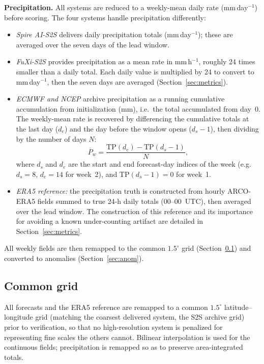 \documentclass[11pt,a4paper]{article}
\begin{document}
\textbf{Precipitation.}
All systems are reduced to a weekly-mean daily rate (mm\,day$^{-1}$)
before scoring. The four systems handle precipitation differently:
\begin{itemize}
  \item \textit{Spire AI-S2S} delivers daily precipitation totals
    (mm\,day$^{-1}$); these are averaged over the seven days of the
    lead window.
  \item \textit{FuXi-S2S} provides precipitation as a mean rate in
    mm\,h$^{-1}$, roughly 24 times smaller than a daily total.
    Each daily value is multiplied by 24 to convert to
    mm\,day$^{-1}$, then the seven days are averaged
    (Section~\ref{sec:metrics}).
  \item \textit{ECMWF and NCEP} archive precipitation as a running
    cumulative accumulation from initialization (mm), i.e.\ the total
    accumulated from day~0. The weekly-mean rate is recovered by
    differencing the cumulative totals at the last day ($d_e$) and the
    day before the window opens ($d_s - 1$), then dividing by the
    number of days $N$:
    \begin{equation}
      \overline{P}_{w} = \frac{\mathrm{TP}(d_e) - \mathrm{TP}(d_s-1)}{N},
      \label{eq:deaccum}
    \end{equation}
    where $d_s$ and $d_e$ are the start and end forecast-day indices
    of the week (e.g.\ $d_s=8$, $d_e=14$ for week~2), and
    $\mathrm{TP}(d_s-1)=0$ for week~1.
  \item \textit{ERA5 reference:} the precipitation truth is constructed
    from hourly ARCO-ERA5 fields summed to true 24-h daily totals
    (00--00~UTC), then averaged over the lead window. The construction
    of this reference and its importance for avoiding a known
    under-counting artifact are detailed in Section~\ref{sec:metrics}.
\end{itemize}
All weekly fields are then remapped to the common $1.5^{\circ}$ grid
(Section~\ref{sec:grid}) and converted to anomalies
(Section~\ref{sec:anom}).

\subsection{Common grid}\label{sec:grid}

All forecasts and the ERA5 reference are remapped to a common
$1.5^{\circ}$ latitude--longitude grid (matching the coarsest delivered
system, the S2S archive grid) prior to verification, so that no
high-resolution system is penalized for representing fine scales the
others cannot. Bilinear interpolation is used for the continuous fields;
precipitation is remapped so as to preserve area-integrated totals.
\end{document}
